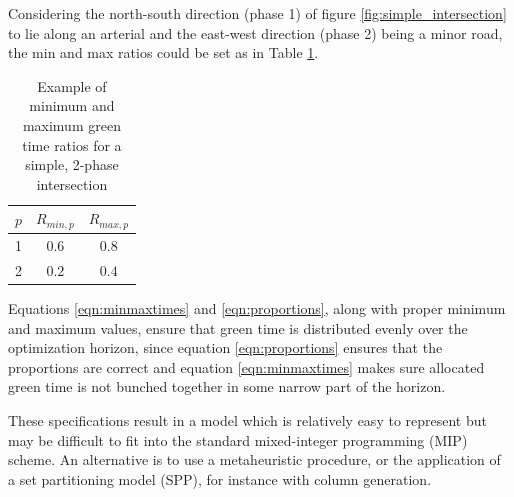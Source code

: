 Considering the north-south direction (phase 1) of figure
\ref{fig:simple_intersection} to lie along an arterial and the
east-west direction (phase 2) being a minor road, the min and max
ratios could be set as in Table \ref{tbl:minmaxratios}.

\begin{table}[!ht]
\begin{center}
\begin{tabular}{c|c|c}
$p$ & $R_{min,p}$ & $R_{max,p}$ \\ \hline
1 & $0.6$ & $0.8$ \\ 
2 & $0.2$ & $0.4$
\end{tabular}
\end{center}
\caption{Example of minimum and maximum green time ratios for a simple, 2-phase intersection}
\label{tbl:minmaxratios}
\end{table}

Equations \ref{eqn:minmaxtimes} and \ref{eqn:proportions},
along with proper minimum and maximum values, ensure that green time
is distributed evenly over the optimization horizon, since equation 
\ref{eqn:proportions} ensures that the proportions are correct and equation
\ref{eqn:minmaxtimes} makes sure allocated green time is not bunched
together in some narrow part of the horizon.

These specifications result in a model which is relatively easy to
represent but may be difficult to fit into the standard mixed-integer
programming (MIP) scheme. An alternative is to use a metaheuristic
procedure, or the application of a set partitioning model (SPP), for
instance with column generation.
